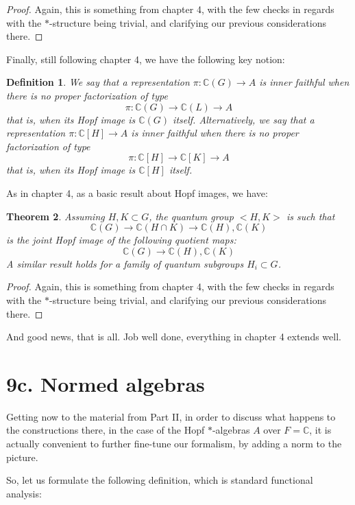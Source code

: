 \documentclass[12pt]{amsbook}
\newtheorem{theorem}{Theorem}[chapter]
\newtheorem{definition}[theorem]{Definition}
\begin{document}
\begin{proof}
Again, this is something from chapter 4, with the few checks in regards with the $*$-structure being trivial, and clarifying our previous considerations there. 
\end{proof}

Finally, still following chapter 4, we have the following key notion:

\begin{definition}
We say that a representation $\pi:\mathbb C(G)\to A$ is inner faithful when there is no proper factorization of type
$$\pi:\mathbb C(G)\to\mathbb C(L)\to A$$
that is, when its Hopf image is $\mathbb C(G)$ itself. Alternatively, we say that a representation $\pi:\mathbb C[H]\to A$ is inner faithful when there is no proper factorization of type
$$\pi:\mathbb C[H]\to\mathbb C[K]\to A$$
that is, when its Hopf image is $\mathbb C[H]$ itself. 
\end{definition}

As in chapter 4, as a basic result about Hopf images, we have:

\begin{theorem}
Assuming $H,K\subset G$, the quantum group $<H,K>$ is such that
$$\mathbb C(G)\to\mathbb C(H\cap K)\to\mathbb C(H),\mathbb C(K)$$
is the joint Hopf image of the following quotient maps:
$$\mathbb C(G)\to\mathbb C(H),\mathbb C(K)$$
A similar result holds for a family of quantum subgroups $H_i\subset G$.
\end{theorem}

\begin{proof}
Again, this is something from chapter 4, with the few checks in regards with the $*$-structure being trivial, and clarifying our previous considerations there. 
\end{proof}

And good news, that is all. Job well done, everything in chapter 4 extends well.

\section*{9c. Normed algebras}

Getting now to the material from Part II, in order to discuss what happens to the constructions there, in the case of the Hopf $*$-algebras $A$ over $F=\mathbb C$, it is actually convenient to further fine-tune our formalism, by adding a norm to the picture.

\bigskip

So, let us formulate the following definition, which is standard functional analysis: 
\end{document}
